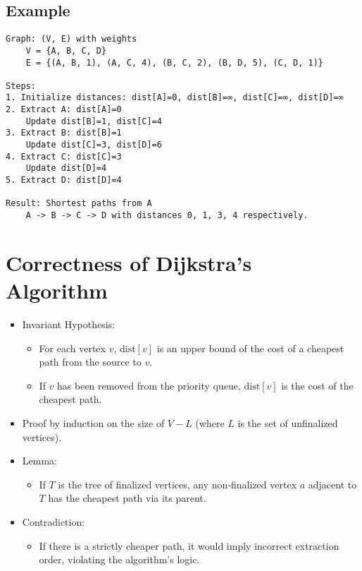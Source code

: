 \documentclass{article}
\begin{document}
\subsection*{Example}
\begin{verbatim}
Graph: (V, E) with weights
    V = {A, B, C, D}
    E = {(A, B, 1), (A, C, 4), (B, C, 2), (B, D, 5), (C, D, 1)}

Steps:
1. Initialize distances: dist[A]=0, dist[B]=∞, dist[C]=∞, dist[D]=∞
2. Extract A: dist[A]=0
    Update dist[B]=1, dist[C]=4
3. Extract B: dist[B]=1
    Update dist[C]=3, dist[D]=6
4. Extract C: dist[C]=3
    Update dist[D]=4
5. Extract D: dist[D]=4

Result: Shortest paths from A
    A -> B -> C -> D with distances 0, 1, 3, 4 respectively.
\end{verbatim}

\section*{Correctness of Dijkstra's Algorithm}
\begin{itemize}
    \item Invariant Hypothesis:
    \begin{itemize}
        \item For each vertex \( v \), \( \text{dist}[v] \) is an upper bound of the cost of a cheapest path from the source to \( v \).
        \item If \( v \) has been removed from the priority queue, \( \text{dist}[v] \) is the cost of the cheapest path.
    \end{itemize}
    \item Proof by induction on the size of \( V - L \) (where \( L \) is the set of unfinalized vertices).
    \item Lemma:
    \begin{itemize}
        \item If \( T \) is the tree of finalized vertices, any non-finalized vertex \( a \) adjacent to \( T \) has the cheapest path via its parent.
    \end{itemize}
    \item Contradiction:
    \begin{itemize}
        \item If there is a strictly cheaper path, it would imply incorrect extraction order, violating the algorithm's logic.
    \end{itemize}
\end{itemize}
\end{document}
